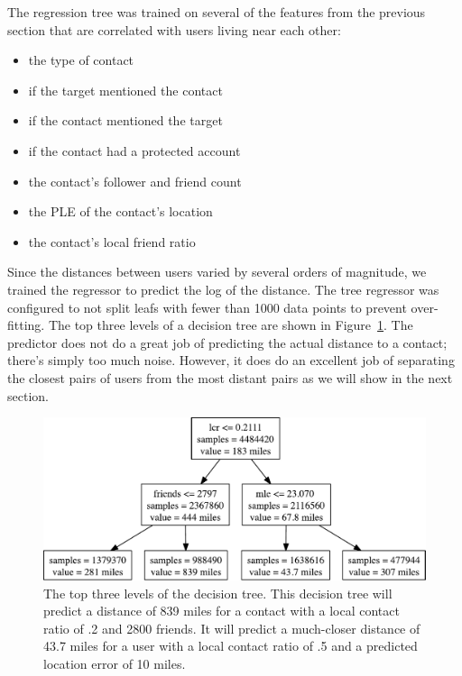The regression tree was trained on several of the features from the previous
section that are correlated with users living near each other:
\begin{itemize}
\item the type of contact
\item if the target mentioned the contact
\item if the contact mentioned the target
\item if the contact had a protected account
\item the contact's follower and friend count
\item the PLE of the contact's location
\item the contact's local friend ratio
\end{itemize}
%
Since the distances between users varied by several orders of magnitude, we
trained the regressor to predict the log of the distance.
%
The tree regressor was configured to not split leafs with fewer than 1000 data
points to prevent over-fitting.
%
The top three levels of a decision tree are shown in Figure~\ref{fig:TreeTop}.
%
The predictor does not do a great job of predicting the actual distance to a
contact; there's simply too much noise.
%
However, it does do an excellent job of separating the closest pairs of users
from the most distant pairs as we will show in the next section.

\begin{figure}[tbh]
\centering
\includegraphics[width=\linewidth]{figures/tree_top.pdf}
\caption{
    The top three levels of the decision tree. This decision tree will predict a
    distance of 839 miles for a contact with a local contact ratio of .2 and
    2800 friends. It will predict a much-closer distance of 43.7 miles for a
    user with a local contact ratio of .5 and a predicted location error of 10
    miles.
}
\label{fig:TreeTop}
\end{figure}

\label{sec:model}

